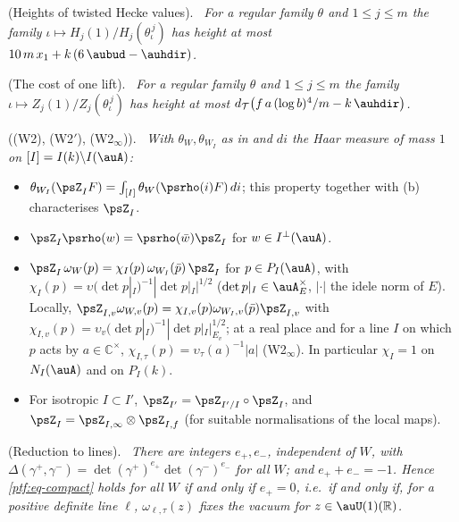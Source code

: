 \documentclass[10pt]{amsart}
\theoremstyle{definition}
\theoremstyle{remark}
\newcommand{\C}{\mathbb C}
\newcommand{\R}{\mathbb R}
\providecommand{\auT}{\mathcal T}
\providecommand{\audT}{d_{\auT}}
\newenvironment{quotedthm}[2]{\par\medskip\noindent\begingroup
  \textbf{#1}#2.\ \itshape\ignorespaces}{\endgroup\par\medskip}
\begin{document}
\begin{quotedthm}{\cite[Proposition~14.42]{P46}}{ (Heights of twisted Hecke values)}
For a regular family $\theta$ and $1\le j\le m$ the family $\iota\mapsto H_j(1)/H_j(\theta_\iota^
{\,j})$ has height at most $10\,m\,x_1+k\,(6\,\aubud-\auhdir)$.
\end{quotedthm}

\begin{quotedthm}{\cite[Proposition~14.43]{P46}}{ (The cost of one lift)}
For a regular family $\theta$ and $1\le j\le m$ the family $\iota\mapsto Z_j(1)/Z_j(\theta_\iota^
{\,j})$ has height at most $\audT\bigl(f\,a\,(\log b)^4/m-k\,\auhdir\bigr)$.
\end{quotedthm}

\begin{quotedthm}{\cite[Proposition~2.14]{P49}}{ ((W2), (W2$'$), (W2$_\infty$))}
With $\theta_W,\theta_{W_I}$ as in {\cite[\S5.1.1]{P49}} and $di$ the Haar measure of mass $1$ on
$[I]=I(k)\backslash I(\auA)$:
\begin{itemize}
\item[(a)] $\theta_{W_I}(\psZ_IF)=\int_{[I]}\theta_W(\psrho(i)F)\,di$; this property together with
\textup{(b)} characterises $\psZ_I$.
\item[(b)] $\psZ_I\psrho(w)=\psrho(\bar w)\psZ_I$ for $w\in I^\perp(\auA)$.
\item[(c)] $\psZ_I\,\omega_W(p)=\chi_I(p)\,\omega_{W_I}(\bar p)\,\psZ_I$ for $p\in P_I(\auA)$, with
$\chi_I(p)=\upsilon(\det p|_I)^{-1}|\det p|_I|^{1/2}$ ($\det p|_I\in\auA_E^\times$, $|\cdot|$ the
idele norm of $E$). Locally, $\psZ_{I,v}\omega_{W,v}(p)=\chi_{I,v}(p)\omega_{W_I,v}(\bar p)
\psZ_{I,v}$ with $\chi_{I,v}(p)=\upsilon_v(\det p|_I)^{-1}|\det p|_I|_{E_v}^{1/2}$; at a real place
and for a line $I$ on which $p$ acts by $a\in\C^\times$, $\chi_{I,\tau}(p)=\upsilon_\tau(a)^{-1}|a|$
\textup{(W2$_\infty$)}. In particular $\chi_I=1$ on $N_I(\auA)$ and on $P_I(k)$.
\item[(d)] For isotropic $I\subset I'$, $\psZ_{I'}=\psZ_{I'/I}\circ\psZ_I$, and $\psZ_I=\psZ_{I,\infty}
\otimes\psZ_{I,f}$ (for suitable normalisations of the local maps).
\end{itemize}
\end{quotedthm}

\begin{quotedthm}{\cite[Lemma~2.20]{P49}}{ (Reduction to lines)}
There are integers $e_+,e_-$, independent of $W$, with $\Delta(\gamma^+,\gamma^-)=\det(\gamma^+)^{e_+}
\det(\gamma^-)^{e_-}$ for all $W$; and $e_++e_-=-1$. Hence \eqref{ptf:eq-compact} holds for all $W$
if and only if $e_+=0$, i.e.\ if and only if, for a positive definite line $\ell$, $\omega_{\ell,\tau}(z)$
fixes the vacuum for $z\in\auU(1)(\R)$.
\end{quotedthm}
\end{document}
